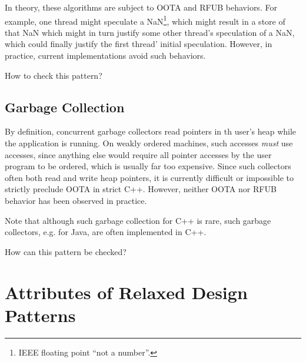 \documentclass[10]{article}
\begin{document}
In theory, these algorithms are subject to OOTA and RFUB behaviors.
For example, one thread might speculate a NaN\footnote{
	IEEE floating point ``not a number''.},
which might result in a store of that NaN which might in turn justify
some other thread's speculation of a NaN, which could finally justify
the first thread' initial speculation.
However, in practice, current implementations avoid such behaviors.

How to check this pattern?

\subsection{Garbage Collection}
\label{sec:Garbage Collection}

By definition, concurrent garbage collectors read pointers in th
user's heap while the application is running.
On weakly ordered machines, such accesses {\it must} use
 accesses, since anything else would require
all pointer accesses by the user program to be ordered, which is usually
far too expensive.
Since such collectors often both read and write heap pointers, it is
currently difficult or impossible to strictly preclude OOTA in strict C++.
However, neither OOTA nor RFUB behavior has been observed in practice.

Note that although such garbage collection for C++ is rare, such garbage
collectors, e.g. for Java, are often implemented in C++.


How can this pattern be checked?

\section{Attributes of Relaxed Design Patterns}
\label{sec:Attributes of Relaxed Design Patterns}
\end{document}

